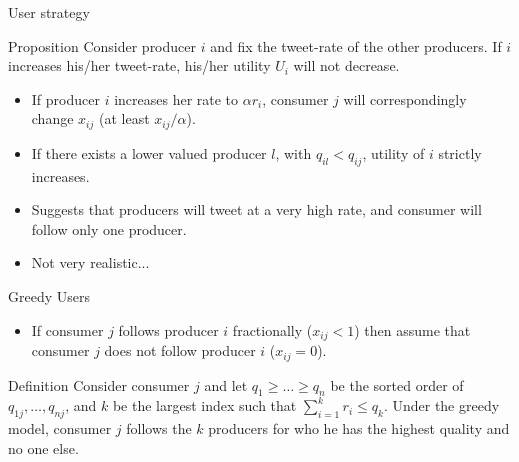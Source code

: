 \documentclass[aspectratio=169]{beamer}
\newcommand{\bi}{\begin{itemize}}
\newcommand{\ei}{\end{itemize}}
\begin{document}
\begin{frame}{User strategy}
    \begin{block}{Proposition}
        Consider producer $i$ and fix the tweet-rate of the other producers. If
        $i$ increases his/her tweet-rate, his/her utility $U_i$ will not
        decrease.
    \end{block}
    \pause
    \bi
\item If producer $i$ increases her rate to $\alpha r_i$, consumer $j$ will
    correspondingly change $x_{ij}$ (at least $x_{ij}/\alpha$).
    \pause
\item If there exists a lower valued producer $l$, with $q_{il} < q_{ij}$,
    utility of $i$ strictly increases.
    \pause
\item Suggests that producers will tweet at a very high rate, and consumer will
    follow only one producer.
    \pause
\item Not very realistic...
    \ei
\end{frame}

\begin{frame}{Greedy Users}
    \bi
\item If consumer $j$ follows producer $i$ fractionally ($x_{ij} < 1$) then
    assume that consumer $j$ does not follow producer $i$ ($x_{ij} = 0$).
    \ei
    \pause
    \begin{block}{Definition}
        Consider consumer $j$ and let $q_1 \geq \ldots \geq q_n$ be the sorted
        order of $q_{1j},\ldots,q_{nj}$, and $k$ be the largest index such that
        $\sum_{i=1}^{k}r_i \leq q_k$. Under the greedy model, consumer $j$
        follows the $k$ producers for who he has the highest quality and no one
        else.
    \end{block}
\end{frame}
\end{document}
